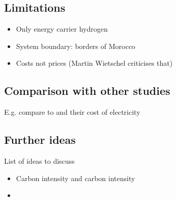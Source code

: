\subsection{Limitations}
\begin{itemize}
    \item Only energy carrier hydrogen
    \item System boundary: borders of Morocco
    \item Costs not prices (Martin Wietschel criticises that)
\end{itemize}

\subsection{Comparison with other studies}
E.g. compare to \cite{Hampp2021} and their cost of electricity

\subsection{Further ideas}
List of ideas to discuss
\begin{itemize}
    \item Carbon intensity and carbon intensity
    \item 
\end{itemize}